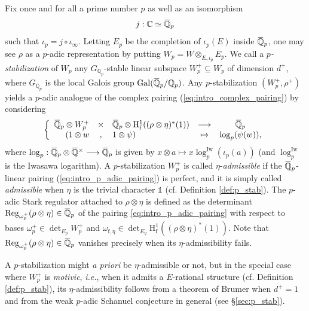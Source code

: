 \documentclass[12pt]{amsart}
\newcommand\bC{\mathbb{C}}
\newcommand\bQ{\mathbb{Q}}
\newcommand\Qp{{\mathbb{Q}_p}}
\newcommand\cO{\mathcal{O}}
\newcommand{\ob}[1]{\mkern 1.5mu\overline{\mkern-1.5mu#1\mkern-1.5mu}\mkern 1.5mu}
\DeclareMathOperator{\Gal}{Gal}
\DeclareMathOperator{\Reg}{Reg}
\newcommand{\HH}{\mathrm{H}}
\newcommand{\ff}{\mathrm{f}}
\newcommand{\Iw}{\mathrm{Iw}}
\theoremstyle{defstyle}
\theoremstyle{thmstyle}
\begin{document}
Fix once and for all a prime number $p$ as well as an isomorphism 
\[j:\bC \simeq \ob{\bQ}_p\]
such that $\iota_p=j \circ \iota_\infty$. Letting $E_{p}$ be the completion of $\iota_p(E)$ inside $\ob{\bQ}_p$, one may see $\rho$ as a $p$-adic representation by putting $W_p=W \otimes_{E,\iota_p}E_p$. We call a \textit{$p$-stabilization} of $W_p$ any $G_{\Qp}$-stable linear subspace $W_p^+ \subseteq W_p$ of dimension $d^+$, where $G_{\Qp}$ is the local Galois group $\Gal(\ob{\bQ}_p/\Qp)$. Any $p$-stabilization $(W_p^+,\rho^+)$ yields a $p$-adic analogue of the complex pairing (\ref{eq:intro_complex_pairing}) by considering
\begin{equation}\label{eq:intro_p_adic_pairing}
\left\{\begin{array}{rclcc} \ob{\bQ}_p \otimes W_p^+ & \times& \ob{\bQ}_p \otimes \HH^1_\ff((\rho\otimes\eta)^*(1)) &\longrightarrow &\ob{\bQ}_p \\
(1 \otimes w &,&1\otimes \psi) &\mapsto & \log_p(\psi(w)),
\end{array}\right.
\end{equation}
where $\log_p: \ob{\bQ}_p \otimes \ob{\bQ}^\times \longrightarrow \ob{\bQ}_p$ is given by  $ x \otimes a \mapsto x \log_p^\Iw(\iota_p(a))$ (and $\log_p^\Iw$ is the Iwasawa logarithm). A $p$-stabilization $W_p^+$ is called $\eta$-\textit{admissible} if the $\ob{\bQ}_p$-linear pairing (\ref{eq:intro_p_adic_pairing}) is perfect, and it is simply called \textit{admissible} when $\eta$ is the trivial character $\mathds{1}$ (cf. Definition \ref{def:p_stab}).  
The $p$-adic Stark regulator attached to $\rho \otimes \eta$ is defined as the determinant $\Reg_{\omega_p^+}(\rho\otimes\eta)\in\ob{\bQ}_p$ of the pairing \eqref{eq:intro_p_adic_pairing} with respect to bases $\omega_p^+\in\det_{E_p}W_p^+$ and $\omega_{\ff,\eta}\in \det_{E_\eta} \HH^1_\ff((\rho\otimes\eta)^*(1))$. Note that $\Reg_{\omega_p^+}(\rho\otimes\eta)\in\ob{\bQ}_p$ vanishes precisely when its $\eta$-admissibility fails. 

A $p$-stabilization might \textit{a priori} be $\eta$-admissible or not, but in the special case where $W_p^+$ is \textit{motivic}, \textit{i.e.}, when it admits a $E$-rational structure (cf. Definition \ref{def:p_stab}), its $\eta$-admissibility follows from a theorem of Brumer when $d^+=1$ and from the weak $p$-adic Schanuel conjecture in general (see \S\ref{sec:p_stab}).
\end{document}
